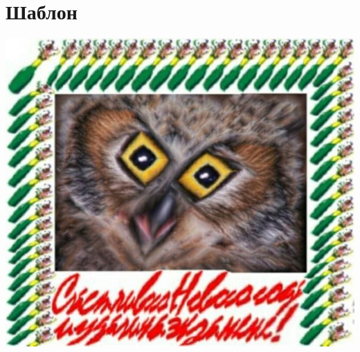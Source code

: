 \documentclass[../main.tex]{subfiles}
\begin{document}
\section{Шаблон}

\includegraphics[scale=0.7]{example.jpg}
\end{document}
